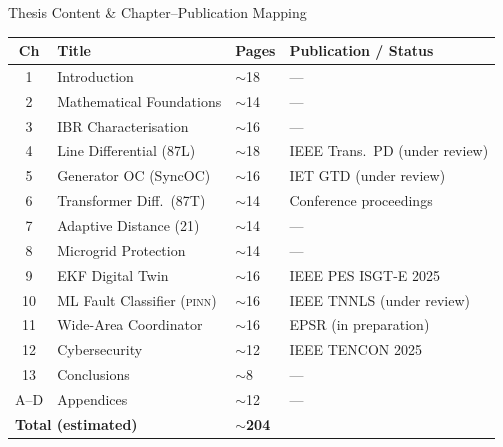 \documentclass[10pt,aspectratio=169]{beamer}
\newcommand{\PINN}{\textsc{pinn}}
\begin{document}
\begin{frame}{Thesis Content \& Chapter--Publication Mapping}
  \begin{center}\footnotesize
    \begin{tabular}{clll}
      \toprule
      \textbf{Ch} & \textbf{Title} & \textbf{Pages} & \textbf{Publication / Status}\\
      \midrule
      1  & Introduction & $\sim$18 & — \\
      2  & Mathematical Foundations & $\sim$14 & — \\
      3  & IBR Characterisation & $\sim$16 & — \\
      4  & Line Differential (87L) & $\sim$18 & IEEE Trans.\ PD (under review)\\
      5  & Generator OC (SyncOC) & $\sim$16 & IET GTD (under review)\\
      6  & Transformer Diff.\ (87T) & $\sim$14 & Conference proceedings\\
      7  & Adaptive Distance (21) & $\sim$14 & — \\
      8  & Microgrid Protection & $\sim$14 & — \\
      9  & EKF Digital Twin & $\sim$16 & IEEE PES ISGT-E 2025\\
      10 & ML Fault Classifier (\PINN) & $\sim$16 & IEEE TNNLS (under review)\\
      11 & Wide-Area Coordinator & $\sim$16 & EPSR (in preparation)\\
      12 & Cybersecurity & $\sim$12 & IEEE TENCON 2025\\
      13 & Conclusions & $\sim$8  & — \\
      A–D & Appendices & $\sim$12 & — \\
      \midrule
      \multicolumn{2}{l}{\textbf{Total (estimated)}} & \textbf{$\sim$204} & \\
      \bottomrule
    \end{tabular}
  \end{center}
\end{frame}
\end{document}
